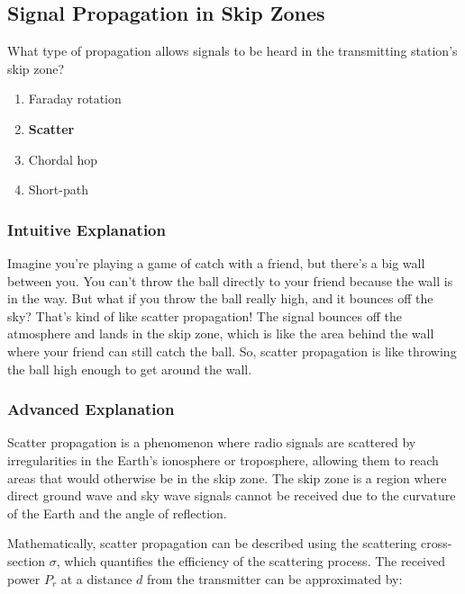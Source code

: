 \subsection{Signal Propagation in Skip Zones}
\label{G3C09}

\begin{tcolorbox}[colback=gray!10!white,colframe=black!75!black,title=G3C09]
What type of propagation allows signals to be heard in the transmitting station’s skip zone?
\begin{enumerate}[label=\Alph*,noitemsep]
    \item Faraday rotation
    \item \textbf{Scatter}
    \item Chordal hop
    \item Short-path
\end{enumerate}
\end{tcolorbox}

\subsubsection{Intuitive Explanation}
Imagine you're playing a game of catch with a friend, but there's a big wall between you. You can't throw the ball directly to your friend because the wall is in the way. But what if you throw the ball really high, and it bounces off the sky? That's kind of like scatter propagation! The signal bounces off the atmosphere and lands in the skip zone, which is like the area behind the wall where your friend can still catch the ball. So, scatter propagation is like throwing the ball high enough to get around the wall.

\subsubsection{Advanced Explanation}
Scatter propagation is a phenomenon where radio signals are scattered by irregularities in the Earth's ionosphere or troposphere, allowing them to reach areas that would otherwise be in the skip zone. The skip zone is a region where direct ground wave and sky wave signals cannot be received due to the curvature of the Earth and the angle of reflection.

Mathematically, scatter propagation can be described using the scattering cross-section \(\sigma\), which quantifies the efficiency of the scattering process. The received power \(P_r\) at a distance \(d\) from the transmitter can be approximated by:

